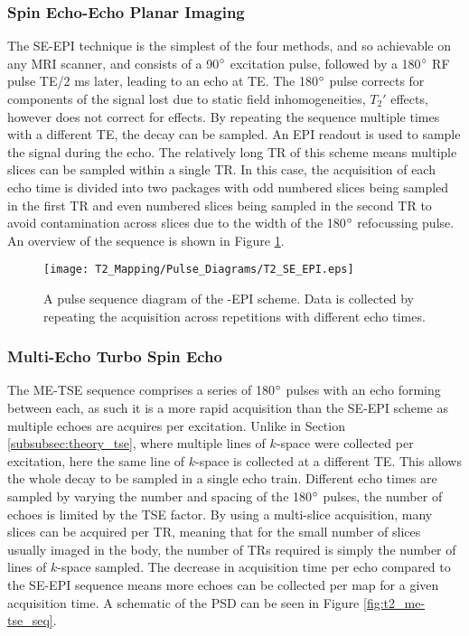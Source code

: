 \subsubsection{Spin Echo-Echo Planar Imaging}
The \acf{SE}-\acf{EPI} technique is the simplest of the four methods, and so achievable on any \ac{MRI} scanner, and consists of a 90$\degree$ excitation pulse, followed by a 180$\degree$ \ac{RF} pulse \ac{TE}/2 ms later, leading to an echo at \ac{TE}. The 180$\degree$ pulse corrects for components of the signal lost due to static field inhomogeneities, $T_2'$ effects, however does not correct for \ttwo effects. By repeating the sequence multiple times with a different \ac{TE}, the \ttwo decay can be sampled. An \ac{EPI} readout is used to sample the signal during the echo. The relatively long \ac{TR} of this scheme means multiple slices can be sampled within a single \ac{TR}. In this case, the acquisition of each echo time is divided into two packages with odd numbered slices being sampled in the first \ac{TR} and even numbered slices being sampled in the second \ac{TR} to avoid contamination across slices due to the width of the 180$\degree$ refocussing pulse. An overview of the sequence is shown in Figure \ref{fig:t2_se-epi_seq}.

\begin{figure}[H]
	\centering
	\texttt{[image: T2\_Mapping/Pulse\_Diagrams/T2\_SE\_EPI.eps]}
	\caption{A pulse sequence diagram of the -\ac{EPI} scheme. Data is collected by repeating the acquisition across repetitions with different echo times.}
	\label{fig:t2_se-epi_seq}	
\end{figure}

\newpage
\subsubsection{Multi-Echo Turbo Spin Echo}
The \acf{ME-TSE} sequence comprises a series of 180$\degree$ pulses with an echo forming between each, as such it is a more rapid acquisition than the \ac{SE}-\ac{EPI} scheme as multiple echoes are acquires per excitation. Unlike in Section \ref{subsubsec:theory_tse}, where multiple lines of $k$-space were collected per excitation, here the same line of $k$-space is collected at a different \ac{TE}. This allows the whole \ttwo decay to be sampled in a single echo train. Different echo times are sampled by varying the number and spacing of the 180$\degree$ pulses, the number of echoes is limited by the \ac{TSE} factor. By using a multi-slice acquisition, many slices can be acquired per \ac{TR}, meaning that for the small number of slices usually imaged in the body, the number of \acp{TR} required is simply the number of lines of $k$-space sampled. The decrease in acquisition time per echo compared to the \ac{SE}-\ac{EPI} sequence means more echoes can be collected per \ttwo map for a given acquisition time. A schematic of the \ac{PSD} can be seen in Figure \ref{fig:t2_me-tse_seq}.

